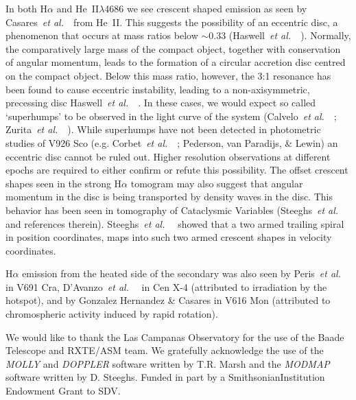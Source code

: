 \documentclass{aa}
\def\etal{{\em et al.}\ }
\begin{document}
In both H$\alpha$ and He~II$\lambda$4686 we see crescent
shaped emission as seen by Casares~\etal~from He~II.
This suggests the possibility of an eccentric disc,
a phenomenon 
that occurs at mass ratios below $\sim 0.33$ (Haswell~\etal~\cite{haswell}). Normally, the comparatively large mass of the compact object, together with conservation of angular momentum, leads to the formation of a circular accretion disc centred on the compact object. Below this mass ratio, however, the 3:1 resonance has been found to cause eccentric instability, leading to a non-axisymmetric, precessing disc Haswell~\etal~\cite{haswell}. In these cases, we would expect so called ‘superhumps’ to be observed in the light curve of the system 
(Calvelo~\etal~\cite{calvelo}; Zurita~\etal~\cite{zurita}). While
superhumps 
have not been detected in photometric studies of V926 Sco (e.g. 
Corbet~\etal~\cite{corbet}; Pederson, van Paradijs, \& Lewin\cite{pederson})
an eccentric disc cannot be ruled out. Higher resolution observations
at different epochs are required to either confirm or refute this possibility. 
The offset crescent shapes seen in the strong H$\alpha$ tomogram
may also suggest that angular momentum in the
disc is being transported by density waves in the disc.  
This behavior has been seen in tomography of Cataclysmic Variables 
(Steeghs~\etal~\cite{steeghs2} and
references therein).  Steeghs~\etal~\cite{steeghs2} showed that a  
two armed trailing spiral in position coordinates, maps into such 
two armed crescent shapes in velocity coordinates.

H$\alpha$ emission from the heated side of the secondary was also
seen by Peris~\etal~\cite{peris} in V691 Cra, D'Avanzo~\etal~\cite{davanzo} 
in Cen X-4 (attributed
to irradiation by the hotspot), and by Gonzalez 
Hernandez \& Casares\cite{gonzalez} in V616 Mon (attributed to 
chromospheric activity induced by rapid 
rotation).   


\begin{acknowledgements}
We would like to thank the Las Campanas Observatory for the use of the Baade Telescope and RXTE/ASM team. We gratefully acknowledge the use of the {\it MOLLY} and {\it DOPPLER} software written by T.R. Marsh and the {\it MODMAP} software written by D. Steeghs. Funded in part by a SmithsonianInstitution Endowment Grant to SDV.
\end{acknowledgements}
\end{document}
